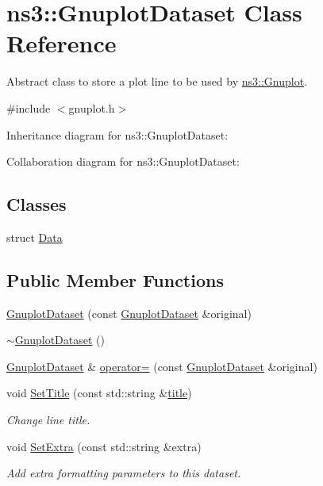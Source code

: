 \hypertarget{classns3_1_1GnuplotDataset}{}\section{ns3\+:\+:Gnuplot\+Dataset Class Reference}
\label{classns3_1_1GnuplotDataset}


Abstract class to store a plot line to be used by \hyperlink{classns3_1_1Gnuplot}{ns3\+::\+Gnuplot}.  




{\ttfamily \#include $<$gnuplot.\+h$>$}



Inheritance diagram for ns3\+:\+:Gnuplot\+Dataset\+:


Collaboration diagram for ns3\+:\+:Gnuplot\+Dataset\+:
\subsection*{Classes}
\begin{DoxyCompactItemize}
\item 
struct \hyperlink{structns3_1_1GnuplotDataset_1_1Data}{Data}
\end{DoxyCompactItemize}
\subsection*{Public Member Functions}
\begin{DoxyCompactItemize}
\item 
\hyperlink{classns3_1_1GnuplotDataset_a048fbf458f82a682178a21af3e4b8091}{Gnuplot\+Dataset} (const \hyperlink{classns3_1_1GnuplotDataset}{Gnuplot\+Dataset} \&original)
\item 
\hyperlink{classns3_1_1GnuplotDataset_afd5eee76e9346c9b380ac81bcd5264ec}{$\sim$\+Gnuplot\+Dataset} ()
\item 
\hyperlink{classns3_1_1GnuplotDataset}{Gnuplot\+Dataset} \& \hyperlink{classns3_1_1GnuplotDataset_a4bcdc60572d08f59e8fd8b614c8373ba}{operator=} (const \hyperlink{classns3_1_1GnuplotDataset}{Gnuplot\+Dataset} \&original)
\item 
void \hyperlink{classns3_1_1GnuplotDataset_add68db1296fcadff7255633c0df96e08}{Set\+Title} (const std\+::string \&\hyperlink{lte__link__budget__x2__handover__measures_8m_a3f4b991df405379f6917e1683ed5a8c8}{title})
\begin{DoxyCompactList}\small\item\em Change line title. \end{DoxyCompactList}\item 
void \hyperlink{classns3_1_1GnuplotDataset_a60d9bf5911e70a58ec11b35969d41fa6}{Set\+Extra} (const std\+::string \&extra)
\begin{DoxyCompactList}\small\item\em Add extra formatting parameters to this dataset. \end{DoxyCompactList}\end{DoxyCompactItemize}
